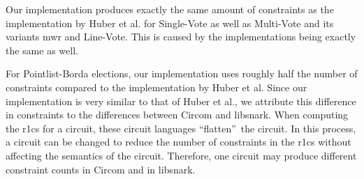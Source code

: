 % 

Our implementation produces exactly the same amount of constraints as the implementation by Huber et al. for Single-Vote as well as Multi-Vote and its variants \gls{mwr} and Line-Vote.
This is caused by the implementations being exactly the same as well.

For Pointlist-Borda elections, our implementation uses roughly half the number of constraints compared to the implementation by Huber et al.
Since our implementation is very similar to that of Huber et al., we attribute this difference in constraints to the differences between Circom and libsnark.
When computing the \gls{r1cs} for a circuit, these circuit languages ``flatten''\ the circuit.
In this process, a circuit can be changed to reduce the number of constraints in the \gls{r1cs} without affecting the semantics of the circuit.
Therefore, one circuit may produce different constraint counts in Circom and in libsnark.

